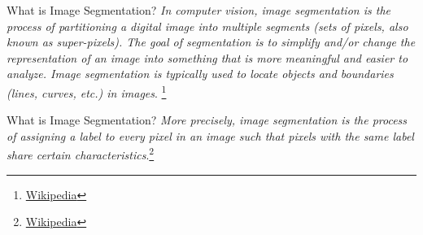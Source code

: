 \documentclass[handout]{beamer}
\begin{document}
\begin{frame}{What is Image Segmentation?}
\emph{In computer vision, image segmentation is the process of partitioning a digital image into multiple segments (sets of pixels, also known as super-pixels). The goal of segmentation is to simplify and/or change the representation of an image into something that is more meaningful and easier to analyze.  Image segmentation is typically used to locate objects and boundaries (lines, curves, etc.) in images}. \footnote{\href{https://en.wikipedia.org/wiki/Image_segmentation}{\color{blue}Wikipedia}}
\end{frame}

\begin{frame}{What is Image Segmentation?}
\emph{More precisely, image segmentation is the process of assigning a label to every pixel in an image such that pixels with the same label share certain characteristics}.\footnote{\href{https://en.wikipedia.org/wiki/Image_segmentation}{\color{blue}Wikipedia}}
\end{frame}
\end{document}
